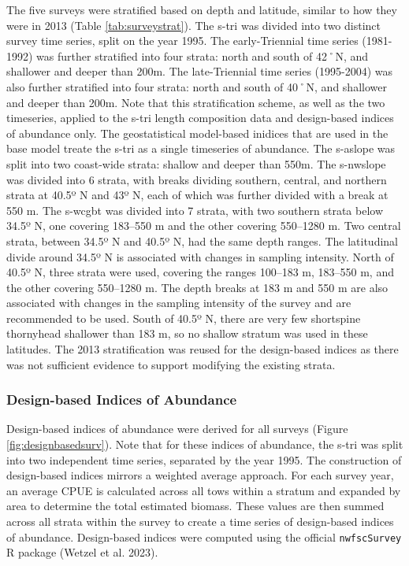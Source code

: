 \documentclass[11pt,
  english,
  letterpaper,
]{article}
\begin{document}
The five surveys were stratified based on depth and latitude, similar to how they were in 2013 (Table \ref{tab:surveystrat}). The \gls{s-tri} was divided into two distinct survey time series, split on the year 1995. The early-Triennial time series (1981-1992) was further stratified into four strata: north and south of 42˚N, and shallower and deeper than 200m. The late-Triennial time series (1995-2004) was also further stratified into four strata: north and south of 40˚N, and shallower and deeper than 200m. Note that this stratification scheme, as well as the two timeseries, applied to the \gls{s-tri} length composition data and design-based indices of abundance only. The geostatistical model-based inidices that are used in the base model treate the \gls{s-tri} as a single timeseries of abundance. The \gls{s-aslope} was split into two coast-wide strata: shallow and deeper than 550m. The \gls{s-nwslope} was divided into 6 strata, with breaks dividing southern, central, and northern strata at 40.5º N and 43º N, each of which was further divided with a break at 550 m. The \gls{s-wcgbt} was divided into 7 strata, with two southern strata below 34.5º N, one covering 183--550 m and the other covering 550--1280 m. Two central strata, between 34.5º N and 40.5º N, had the same depth ranges. The latitudinal divide around 34.5º N is associated with changes in sampling intensity. North of 40.5º N, three strata were used, covering the ranges 100--183 m, 183--550 m, and the other covering 550--1280 m. The depth breaks at 183 m and 550 m are also associated with changes in the sampling intensity of the survey and are recommended to be used. South of 40.5º N, there are very few shortspine thornyhead shallower than 183 m, so no shallow stratum was used in these latitudes. The 2013 stratification was reused for the design-based indices as there was not sufficient evidence to support modifying the existing strata.

\hypertarget{design-based-indices-of-abundance}{%
\subsubsection{Design-based Indices of Abundance}\label{design-based-indices-of-abundance}}

Design-based indices of abundance were derived for all surveys (Figure \ref{fig:designbasedsurv}). Note that for these indices of abundance, the \gls{s-tri} was split into two independent time series, separated by the year 1995. The construction of design-based indices mirrors a weighted average approach. For each survey year, an average CPUE is calculated across all tows within a stratum and expanded by area to determine the total estimated biomass. These values are then summed across all strata within the survey to create a time series of design-based indices of abundance. Design-based indices were computed using the official \texttt{nwfscSurvey} R package (Wetzel et al. 2023).
\end{document}

